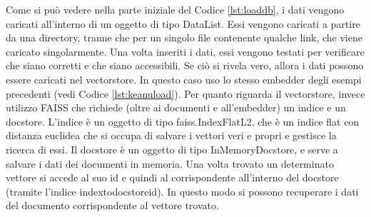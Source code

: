 Come si può vedere nella parte iniziale del Codice \ref{lst:loaddb}, i dati vengono caricati all'interno di un oggetto di tipo DataList. Essi vengono caricati a partire da una directory, tranne che per un singolo file contenente qualche link, che viene caricato singolarmente. Una volta inseriti i dati, essi vengono testati per verificare che siano corretti e che siano accessibili.
Se ciò si rivela vero, allora i dati possono essere caricati nel vectorstore. In questo caso uso lo stesso embedder degli esempi precedenti (vedi Codice \ref{lst:keanuload}). Per quanto riguarda il vectorstore, invece utilizzo FAISS che richiede (oltre ai documenti e all'embedder) un indice e un docstore. L'indice è un oggetto di tipo faiss.IndexFlatL2, che è un indice flat con distanza euclidea che si occupa di salvare i vettori veri e propri e gestisce la ricerca di essi. Il docstore è un oggetto di tipo InMemoryDocstore, e serve a salvare i dati dei documenti in memoria. Una volta trovato un determinato vettore si accede al suo id e quindi al corrispondente all'interno del docstore (tramite l'indice index\textunderscore to\textunderscore docstore\textunderscore id). In questo modo si possono recuperare i dati del documento corrispondente al vettore trovato.